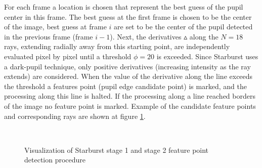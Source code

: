 For each frame a location is chosen that represent the best guess of the pupil center in this frame. The best guess at the first frame is chosen to be the center of the image, best guess at frame $i$ are set to be the center of the pupil detected in the previous frame (frame $i-1$).  Next, the derivatives $\vartriangle$ along the $N = 18$ rays, extending radially away from this starting point, are independently evaluated pixel by pixel until a threshold $\phi = 20$ is exceeded. Since Starburst uses a dark-pupil technique, only positive derivatives (increasing intensity as the ray extends) are considered. When the value of the derivative along the line exceeds the threshold a features point (pupil edge candidate point) is marked, and the processing along this line is halted. If the processing along a line reached borders of the image no feature point is marked. Example of the candidate feature points and corresponding rays are shown at figure \ref{fig:starburst_example}. \bigskip


\begin{figure}[]
\begin{dBox}
\centering
  \mbox{
   }
   \caption{Visualization of Starburst stage 1 and stage 2 feature point detection procedure \label{fig:starburst_example} }   
\end{dBox}   
\end{figure}


